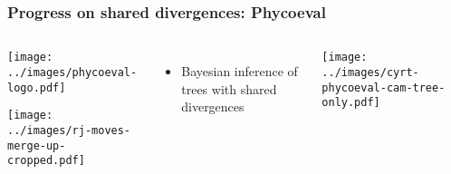 \setcounter{footnote}{0}
\begin{frame}[t]
    \frametitle{Progress on shared divergences: Phycoeval}

    \begin{columns}

        \begin{minipage}[c][\frametextheight][c]{\columnwidth}
            \begin{center}
                \texttt{[image: ../images/phycoeval-logo.pdf]}

                \smallskip
                \texttt{[image: ../images/rj-moves-merge-up-cropped.pdf]}
            \end{center}

            \smallskip
            \begin{itemize}
                \item Bayesian inference of trees with shared divergences
            \end{itemize}
        \end{minipage}


        \begin{minipage}[c][\frametextheight][t]{\columnwidth}
            \begin{center}
                \texttt{[image: ../images/cyrt-phycoeval-cam-tree-only.pdf]}
            \end{center}
        \end{minipage}

    \end{columns}

\end{frame}
\setcounter{footnote}{0}
